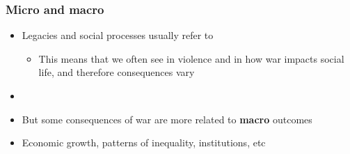 \documentclass[aspectratio=43]{beamer}
\begin{document}

%
%





\begin{frame}
\frametitle{Micro and macro}
\centering

\begin{itemize}
  \item Legacies and social processes usually refer to \textbf{{\color{red}{micro-level consequences}}}
  \begin{itemize}
    \item This means that we often see {\color{red}{variation}} in violence and in how war impacts social life, and therefore consequences vary
  \end{itemize}
  \item[]
  \item But some consequences of war are more related to \textbf{macro} outcomes
  \item[] Economic growth, patterns of inequality, institutions, etc
\end{itemize}

\end{frame}
  
\end{document}
